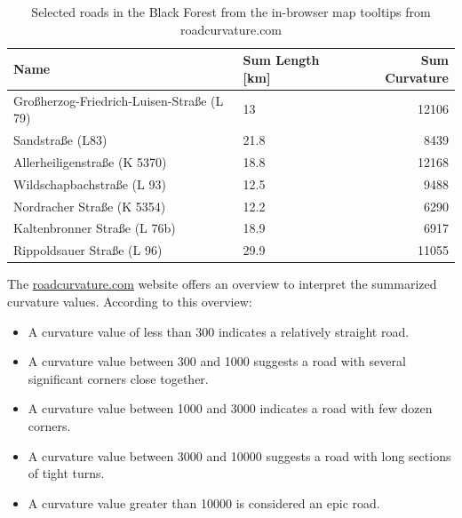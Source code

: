     \begin{table}[htb]
    \centering
    \begin{tabular}{@{}llr@{}} \toprule
        Name                                      & Sum Length [km] & Sum Curvature \\ \midrule
        Großherzog-Friedrich-Luisen-Straße (L 79) & 13              & 12106         \\
        Sandstraße (L83)                          & 21.8            & 8439          \\
        Allerheiligenstraße (K 5370)              & 18.8            & 12168         \\
        Wildschapbachstraße (L 93)                & 12.5            & 9488          \\
        Nordracher Straße (K 5354)                & 12.2            & 6290          \\
        Kaltenbronner Straße (L 76b)              & 18.9            & 6917          \\
        Rippoldsauer Straße (L 96)              & 29.9              & 11055         \\\bottomrule
    \end{tabular}
    \caption{Selected roads in the Black Forest from the in-browser map tooltips from roadcurvature.com} 
    \label{tab:roadsample}
    \end{table}

The \hyperlink{https://roadcurvature.com}{roadcurvature.com} website offers an overview to interpret the summarized curvature values. According to this overview:
\begin{itemize}
    \item A curvature value of less than 300 indicates a relatively straight road.
    \item A curvature value between 300 and 1000 suggests a road with several significant corners close together.
    \item A curvature value between 1000 and 3000 indicates a road with few dozen corners.
    \item A curvature value between 3000 and 10000 suggests a road with long sections of tight turns.
    \item A curvature value greater than 10000 is considered an epic road.
\end{itemize}

